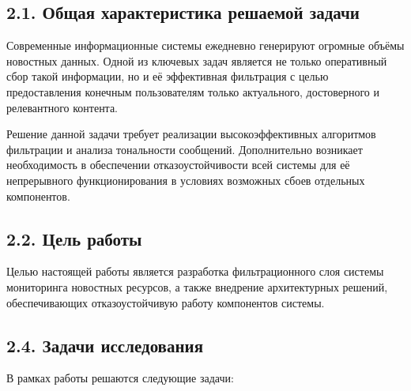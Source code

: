 \hypertarget{ux43eux431ux449ux430ux44f-ux445ux430ux440ux430ux43aux442ux435ux440ux438ux441ux442ux438ux43aux430-ux440ux435ux448ux430ux435ux43cux43eux439-ux437ux430ux434ux430ux447ux438}{%
\subsection{2.1. Общая характеристика решаемой
задачи}\label{ux43eux431ux449ux430ux44f-ux445ux430ux440ux430ux43aux442ux435ux440ux438ux441ux442ux438ux43aux430-ux440ux435ux448ux430ux435ux43cux43eux439-ux437ux430ux434ux430ux447ux438}}

Современные информационные системы ежедневно генерируют огромные объёмы
новостных данных. Одной из ключевых задач является не только оперативный
сбор такой информации, но и её эффективная фильтрация с целью
предоставления конечным пользователям только актуального, достоверного и
релевантного контента.

Решение данной задачи требует реализации высокоэффективных алгоритмов
фильтрации и анализа тональности сообщений. Дополнительно возникает
необходимость в обеспечении отказоустойчивости всей системы для её
непрерывного функционирования в условиях возможных сбоев отдельных
компонентов.

\hypertarget{ux446ux435ux43bux44c-ux440ux430ux431ux43eux442ux44b}{%
\subsection{2.2. Цель
работы}\label{ux446ux435ux43bux44c-ux440ux430ux431ux43eux442ux44b}}

Целью настоящей работы является разработка фильтрационного слоя системы
мониторинга новостных ресурсов, а также внедрение архитектурных решений,
обеспечивающих отказоустойчивую работу компонентов системы.

\hypertarget{ux437ux430ux434ux430ux447ux438-ux438ux441ux441ux43bux435ux434ux43eux432ux430ux43dux438ux44f}{%
\subsection{2.4. Задачи
исследования}\label{ux437ux430ux434ux430ux447ux438-ux438ux441ux441ux43bux435ux434ux43eux432ux430ux43dux438ux44f}}

В рамках работы решаются следующие задачи:

